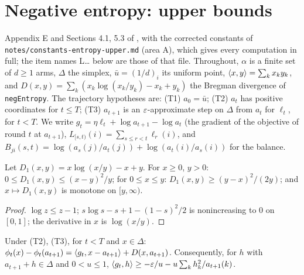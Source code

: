 \chapter{Negative entropy: upper bounds}
\label{chap:entropy_upper}

Appendix E and Sections 4.1, 5.3 of \cite{SSKM26}, with the corrected constants of
\texttt{notes/constants-entropy-upper.md} (area A), which gives every computation in full; the
item names L\ldots{} below are those of that file. Throughout, $\alpha$ is a finite set of
$d \ge 1$ arms, $\Delta$ the simplex, $\bar u = (1/d)_i$ its uniform point, $\langle x, y \rangle =
\sum_k x_k y_k$, and $D(x, y) = \sum_k (x_k \log(x_k/y_k) - x_k + y_k)$ the Bregman divergence of
\texttt{negEntropy}. The trajectory hypotheses are: (T1) $a_0 = \bar u$; (T2) $a_t$ has positive
coordinates for $t \le T$; (T3) $a_{t+1}$ is an $\varepsilon$-approximate step on $\Delta$ from $a_t$ for
$\ell_t$, for $t < T$. We write $g_t = \eta\ell_t + \log a_{t+1} - \log a_t$ (the gradient of the
objective of round $t$ at $a_{t+1}$), $L_{[s,t)}(i) = \sum_{s \le r < t} \ell_r(i)$, and
$B_{ji}(s, t) = \log(a_s(j)/a_t(j)) + \log(a_t(i)/a_s(i))$ for the balance.

\begin{lemma}
  \label{lem:entropy_scalar}
  \leanok
  Let $D_1(x, y) = x\log(x/y) - x + y$. For $x \ge 0$, $y > 0$: $0 \le D_1(x, y) \le (x - y)^2/y$;
  for $0 \le x \le y$: $D_1(x, y) \ge (y - x)^2/(2y)$; and $x \mapsto D_1(x, y)$ is monotone on
  $[y, \infty)$.
\end{lemma}

\begin{proof}
  \leanok
  $\log z \le z - 1$; $s \log s - s + 1 - (1 - s)^2/2$ is nonincreasing to $0$ on $[0, 1]$; the
  derivative in $x$ is $\log(x/y)$.
\end{proof}

\begin{lemma}
  \label{lem:entropy_approx_first_order}
  \leanok
  Under (T2), (T3), for $t < T$ and $x \in \Delta$:
  $\phi_t(x) - \phi_t(a_{t+1}) = \langle g_t, x - a_{t+1} \rangle + D(x, a_{t+1})$. Consequently, for $h$ with
  $a_{t+1} + h \in \Delta$ and $0 < u \le 1$,
  $\langle g_t, h \rangle \ge -\varepsilon/u - u \sum_k h_k^2 / a_{t+1}(k)$.
\end{lemma}

